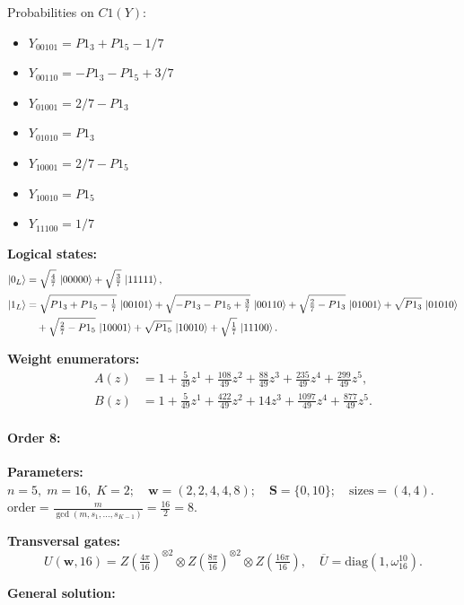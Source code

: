 \documentclass[11pt]{article}
\begin{document}
Probabilities on $C1 (Y)$:
\begin{itemize}
    \item $Y_{00101} = P1_3 + P1_5 - 1/7$
    \item $Y_{00110} = -P1_3 - P1_5 + 3/7$
    \item $Y_{01001} = 2/7 - P1_3$
    \item $Y_{01010} = P1_3$
    \item $Y_{10001} = 2/7 - P1_5$
    \item $Y_{10010} = P1_5$
    \item $Y_{11100} = 1/7$
\end{itemize}

\noindent\textbf{Logical states:}
\begin{align*}
\ket{0_L} &= \sqrt{\tfrac{4}{7}}\,\ket{00000} + \sqrt{\tfrac{3}{7}}\,\ket{11111},
\\[2pt]
\ket{1_L} &= \sqrt{P1_3 + P1_5 - \tfrac{1}{7}}\,\ket{00101} + \sqrt{-P1_3 - P1_5 + \tfrac{3}{7}}\,\ket{00110} + \sqrt{\tfrac{2}{7} - P1_3}\,\ket{01001} + \sqrt{P1_3}\,\ket{01010}\\
&\quad + \sqrt{\tfrac{2}{7} - P1_5}\,\ket{10001} + \sqrt{P1_5}\,\ket{10010} + \sqrt{\tfrac{1}{7}}\,\ket{11100}.
\end{align*}

\noindent\textbf{Weight enumerators:}
\begin{align*}
A(z) &= 1 + \tfrac{5}{49}z^{1} + \tfrac{108}{49}z^{2} + \tfrac{88}{49}z^{3} + \tfrac{235}{49}z^{4} + \tfrac{299}{49}z^{5},\\[2pt]
B(z) &= 1 + \tfrac{5}{49}z^{1} + \tfrac{422}{49}z^{2} + 14z^{3} + \tfrac{1097}{49}z^{4} + \tfrac{877}{49}z^{5}.
\end{align*}

\paragraph{\textbf{Order 8:}}
\noindent\textbf{Parameters:} $n=5,\; m=16,\; K=2;\quad \mathbf w=(2, 2, 4, 4, 8);\quad \mathbf S=\{0, 10\};\quad \text{sizes}=\left(4, 4\right).$ $\displaystyle \text{order}=\frac{m}{\gcd(m,s_1,\dots,s_{K-1})}=\frac{16}{2}=8.$

\noindent\textbf{Transversal gates:}
\[
    U(\mathbf w,16)=Z \left(\tfrac{4\pi}{16}\right)^{\otimes2} \otimes Z \left(\tfrac{8\pi}{16}\right)^{\otimes2} \otimes Z \left(\tfrac{16\pi}{16}\right),\quad
    \overline U=\mathrm{diag}(1,\omega_{16}^{10}).
\]

\noindent\textbf{General solution:}
\end{document}
